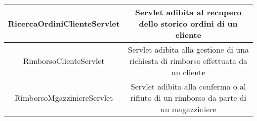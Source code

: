 \documentclass[12pt,a4paper]{article}
\begin{document}
\begin{center}
\begin{tabular}{|c|c|}
RicercaOrdiniClienteServlet & \begin{minipage}{10cm} \vspace{5pt}
Servlet adibita al recupero dello storico ordini di un cliente \vspace{5pt}
\end{minipage} \\ \hline

RimborsoClienteServlet & \begin{minipage}{10cm} \vspace{5pt}
Servlet adibita alla gestione di una richiesta di rimborso effettuata da un cliente \vspace{5pt}
\end{minipage} \\ \hline

RimborsoMgazziniereServlet & \begin{minipage}{10cm} \vspace{5pt}
Servlet adibita alla conferma o al rifiuto di un rimborso da parte di un magazziniere \vspace{5pt}
\end{minipage} \\ \hline

\end{tabular}
\end{center}
\end{document}
